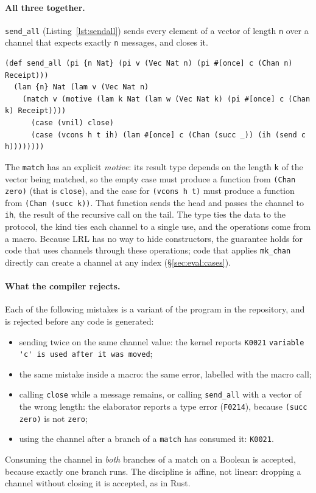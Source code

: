 \paragraph{All three together.}
\lstinline|send_all| (Listing~\ref{lst:sendall}) sends every element of a vector of length \lstinline|n| over a channel that expects exactly \lstinline|n| messages, and closes it.
\begin{lstlisting}[float=*,caption={Sending a vector over a channel: dependent types, ownership and macro-generated operations in one function.},label={lst:sendall}]
(def send_all (pi {n Nat} (pi v (Vec Nat n) (pi #[once] c (Chan n) Receipt)))
  (lam {n} Nat (lam v (Vec Nat n)
    (match v (motive (lam k Nat (lam w (Vec Nat k) (pi #[once] c (Chan k) Receipt))))
      (case (vnil) close)
      (case (vcons h t ih) (lam #[once] c (Chan (succ _)) (ih (send c h))))))))
\end{lstlisting}
The \lstinline|match| has an explicit \emph{motive}: its result type depends on the length \lstinline|k| of the vector being matched, so the empty case must produce a function from \lstinline|(Chan zero)| (that is \lstinline|close|), and the case for \lstinline|(vcons h t)| must produce a function from \lstinline|(Chan (succ k))|.
That function sends the head and passes the channel to \lstinline|ih|, the result of the recursive call on the tail.
The type ties the data to the protocol, the kind ties each channel to a single use, and the operations come from a macro.
Because LRL has no way to hide constructors, the guarantee holds for code that uses channels through these operations; code that applies \lstinline|mk_chan| directly can create a channel at any index (\S\ref{sec:eval:cases}).

\paragraph{What the compiler rejects.}
Each of the following mistakes is a variant of the program in the repository, and is rejected before any code is generated:
\begin{itemize}\setlength\itemsep{1pt}
\item sending twice on the same channel value: the kernel reports \texttt{K0021} \lstinline|variable 'c' is used after it was moved|;
\item the same mistake inside a macro: the same error, labelled with the macro call;
\item calling \lstinline|close| while a message remains, or calling \lstinline|send_all| with a vector of the wrong length: the elaborator reports a type error (\texttt{F0214}), because \lstinline|(succ zero)| is not \lstinline|zero|;
\item using the channel after a branch of a \lstinline|match| has consumed it: \texttt{K0021}.
\end{itemize}
Consuming the channel in \emph{both} branches of a match on a Boolean is accepted, because exactly one branch runs.
The discipline is affine, not linear: dropping a channel without closing it is accepted, as in Rust.

